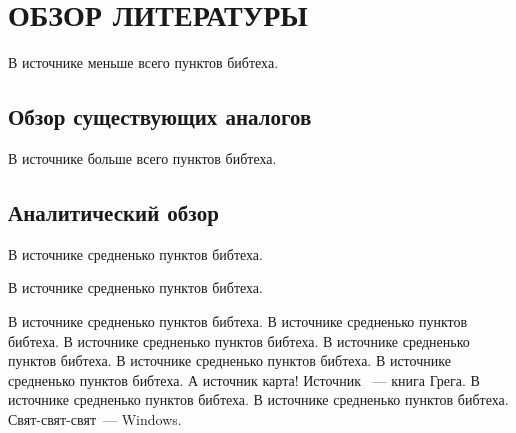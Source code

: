 \section{ОБЗОР ЛИТЕРАТУРЫ}
\label{sec:domain}

В источнике \cite{kernel_docs} меньше всего пунктов бибтеха.

\subsection{Обзор существующих аналогов}
\label{sub:domain:analogs}

В источнике \cite{rlove} больше всего пунктов бибтеха.

\subsection{Аналитический обзор}
\label{sub:domain:analitic_overview}

В источнике \cite{understanding} средненько пунктов бибтеха.

В источнике \cite{tanenbaum} средненько пунктов бибтеха.

В источнике \cite{johnson} средненько пунктов бибтеха.
В источнике \cite{kernelnewbies} средненько пунктов бибтеха.
В источнике \cite{vagin} средненько пунктов бибтеха.
В источнике \cite{lkml} средненько пунктов бибтеха.
В источнике \cite{anatomy} средненько пунктов бибтеха.
В источнике \cite{lwn} средненько пунктов бибтеха.
А источник \cite{map} карта!
Источник \cite{greg}~--- книга Грега.
В источнике \cite{profarch} средненько пунктов бибтеха.
В источнике \cite{man_syscall} средненько пунктов бибтеха.
Свят-свят-свят\cite{win_tool_help}~--- Windows.
